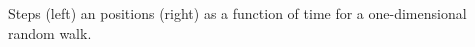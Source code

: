 \label{fig:stepsVersusTime} Steps (left) an positions (right) as a function of time for a one-dimensional random walk.